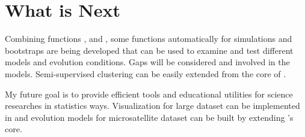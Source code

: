 \section[What is Next]{What is Next}
\label{sec:more}

Combining functions ,  and ,
some functions automatically for simulations and bootstraps are being
developed that can be used to examine and test different models and evolution
conditions.
Gaps will be considered and involved in the models.
Semi-supervised clustering can be easily extended from
the core of .

My future goal is to provide efficient tools and educational utilities
for science researches in statistics ways.
Visualization for large dataset \citep{Pemberton2008, Conrad2006} can
be implemented in  and evolution models for microsatellite
dataset \citep{Rosenberg2002,Shringarpure2009} can be built by extending
's core.

